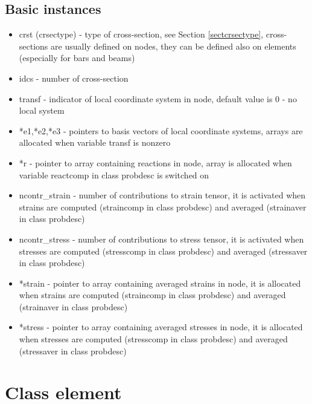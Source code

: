 \subsection{Basic instances}
\begin{itemize}
\item{crst (crsectype) - type of cross-section, see Section \ref{sectcrsectype},
cross-sections are usually defined on nodes, they can
be defined also on elements (especially for bars and beams)}

\item{idcs - number of cross-section}

\item{transf - indicator of local coordinate system in node, default value is 0 - no local system}

\item{*e1,*e2,*e3 - pointers to basis vectors of local coordinate systems,
arrays are allocated when variable transf is nonzero}

\item{*r - pointer to array containing reactions in node, array is allocated when variable
reactcomp in class probdesc is switched on}

\item{ncontr\_strain - number of contributions to strain tensor, it is activated when strains are computed
(straincomp in class probdesc) and averaged (strainaver in class probdesc)}

\item{ncontr\_stress - number of contributions to stress tensor, it is activated when stresses are computed
(stresscomp in class probdesc) and averaged (stressaver in class probdesc)}

\item{*strain - pointer to array containing averaged strains in node, it is allocated when strains are computed
(straincomp in class probdesc) and averaged (strainaver in class probdesc)}

\item{*stress - pointer to array containing averaged stresses in node, it is allocated when stresses are computed
(stresscomp in class probdesc) and averaged (stressaver in class probdesc)}
\end{itemize}


\section{Class {\sf element}}
\label{sectelement}

